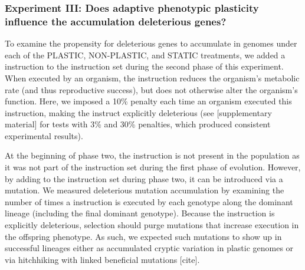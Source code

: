 \vspace{0.5cm}
\subsubsection{Experiment III: Does adaptive phenotypic plasticity influence the accumulation deleterious genes?}
\label{sec:methods:experiment-deleterious-hitchhiking}

To examine the propensity for deleterious genes to accumulate in genomes under each of the PLASTIC, NON-PLASTIC, and STATIC treatments, we added a  instruction to the instruction set during the second phase of this experiment.
When executed by an organism, the  instruction reduces the organism's metabolic rate (and thus reproductive success), but does not otherwise alter the organism's function.
Here, we imposed a 10\% penalty each time an organism executed this instruction, making the instruct explicitly deleterious (see [supplementary material] for tests with 3\% and 30\% penalties, which produced consistent experimental results).

At the beginning of phase two, the  instruction is not present in the population as it was not part of the instruction set during the first phase of evolution.
However, by adding  to the instruction set during phase two, it can be introduced via a mutation.
We measured deleterious mutation accumulation by examining the number of times a  instruction is executed by each genotype along the dominant lineage (including the final dominant genotype).
Because the  instruction is explicitly deleterious, selection should purge mutations that increase  execution in the offspring phenotype.
As such, we expected such mutations to show up in successful lineages either as accumulated cryptic variation in plastic genomes or via hitchhiking with linked beneficial mutations [cite].


